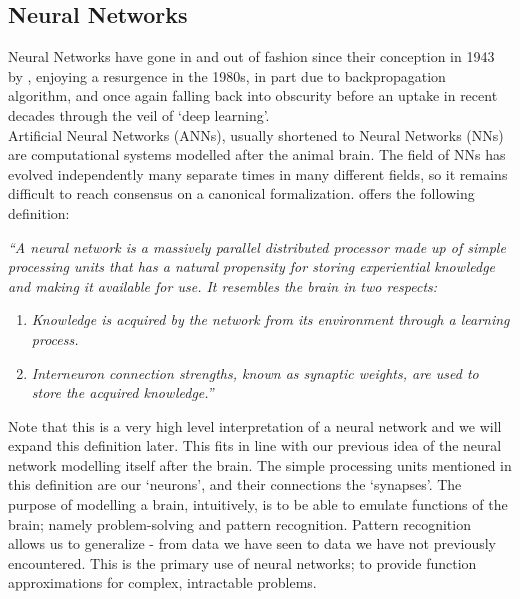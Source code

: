 \documentclass[12pt]{article}
\begin{document}
\subsection{Neural Networks}\label{networks}
Neural Networks have gone in and out of fashion since their conception in 1943 by \textcite{mcculloch1943logical}, enjoying a resurgence in the 1980s, in part due to \textcite{werbos1974beyond} backpropagation algorithm, and once again falling back into obscurity before an uptake in recent decades through the veil of `deep learning'.\\\newline
Artificial Neural Networks (ANNs), usually shortened to Neural Networks (NNs) are computational systems modelled after the animal brain. The field of NNs has evolved independently many separate times in many different fields, so it remains difficult to reach consensus on a canonical formalization. \textcite{haykin2010neural} offers the following definition: \\\newline
\begin{addmargin}[2em]{0em}%
    \textit{``A neural network is a massively parallel distributed processor made up of simple processing
    units that has a natural propensity for storing experiential knowledge and making it available
    for use. It resembles the brain in two respects:}
    \begin{enumerate}
        \item \textit{Knowledge is acquired by the network from its environment through a learning process.}
        \item \textit{Interneuron connection strengths, known as synaptic weights, are used to store the acquired knowledge.''}
    \end{enumerate}
\end{addmargin}
Note that this is a very high level interpretation of a neural network and we will expand this definition later. This fits in line with our previous idea of the neural network modelling itself after the brain. The simple processing units mentioned in this definition are our `neurons', and their connections the `synapses'. The purpose of modelling a brain, intuitively, is to be able to emulate functions of the brain; namely problem-solving and pattern recognition. Pattern recognition allows us to generalize - from data we have seen to data we have not previously encountered. This is the primary use of neural networks; to provide function approximations for complex, intractable problems. 
\end{document}
